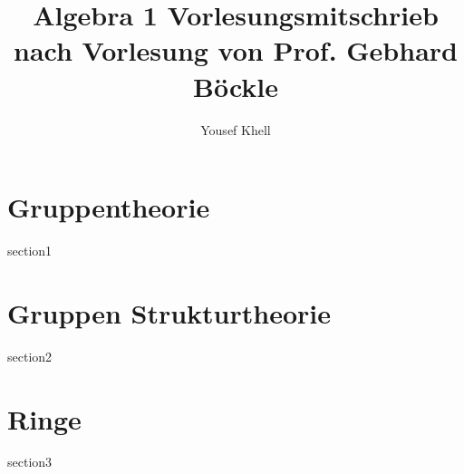 \documentclass[a4paper]{report}
\title{\vspace{-2cm} Algebra 1 Vorlesungsmitschrieb\\nach Vorlesung von Prof. Gebhard Böckle}
\author{Yousef Khell}
\begin{document}
\maketitle
\tableofcontents

\chapter{Gruppentheorie}
{section1}

\chapter{Gruppen Strukturtheorie}
{section2}

\chapter{Ringe}
{section3}
\end{document}

